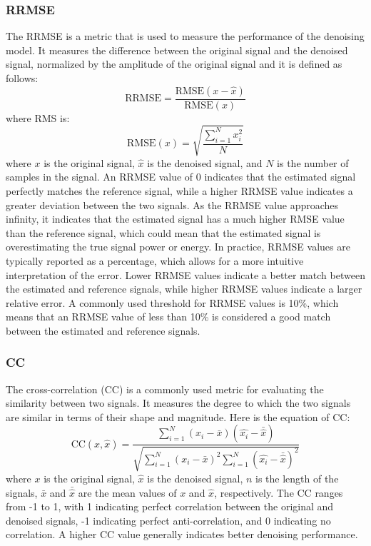 \documentclass[a4paper, noexaminfo]{sapthesis}
\begin{document}
\subsubsection{RRMSE}
The RRMSE is a metric that is used to measure the performance of the
denoising model. It measures the difference between the original signal
 and the denoised signal, normalized by the amplitude of the original 
 signal and it is defined as follows:
\begin{equation}
\text{RRMSE} = \frac{\text{RMSE}(x-\hat{x})}{\text{RMSE}(x)}
\end{equation}
where RMS is:
\begin{equation}
\text{RMSE}(x) = \sqrt{\frac{\sum_{i=1}^{N}{x_i^2}}{N}}
\end{equation}
where $x$ is the original signal, $\hat{x}$ is the denoised signal,
  and $N$ is the number of samples in the signal.\newline
  An RRMSE value of 0 indicates that the estimated signal perfectly 
  matches the reference signal, while a higher RRMSE value indicates 
  a greater deviation between the two signals. As the RRMSE value 
  approaches infinity, it indicates that the estimated signal has a 
  much higher RMSE value than the reference signal, which could mean 
  that the estimated signal is overestimating the true signal power 
  or energy.\newline
  In practice, RRMSE values are typically reported as a percentage, 
  which allows for a more intuitive interpretation of the error. 
  Lower RRMSE values indicate a better match between the estimated 
  and reference signals, while higher RRMSE values indicate a larger 
  relative error. A commonly used threshold for RRMSE values is 10\%, 
  which means that an RRMSE value of less than 10\% is considered 
  a good match between the estimated and reference signals. 
\subsubsection{CC}
The cross-correlation (CC) is a commonly used metric for evaluating the
 similarity between two signals. It measures the degree to which the two
  signals are similar in terms of their shape and magnitude. Here is the 
equation of CC:
\begin{equation}
\text{CC}(x,\hat{x}) = \frac{\sum_{i=1}^{N} (x_i - \bar{x})(\hat{x_i} - \bar{\hat{x}})}{\sqrt{\sum_{i=1}^{N} (x_i - \bar{x})^2 \sum_{i=1}^{N} (\hat{x_i} - \bar{\hat{x}})^2}}
\end{equation}
where $x$ is the original signal, $\hat{x}$ is the denoised signal, 
$n$ is the length of the signals, $\bar{x}$ and $\bar{\hat{x}}$ are 
the mean values of $x$ and $\hat{x}$, respectively.\newline
The CC ranges from -1 to 1, with 1 indicating perfect correlation between 
the original and denoised signals, -1 indicating perfect anti-correlation, 
and 0 indicating no correlation. A higher CC value generally indicates 
better denoising performance.
\end{document}
